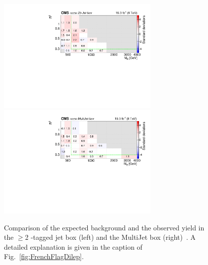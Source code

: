 \begin{figure}[tb!]
\centering
\includegraphics[width=0.7\textwidth]{figs/analysis8TeV/nSigmaLog_Jet2b.pdf}
\includegraphics[width=0.7\textwidth]{figs/analysis8TeV/nSigmaLog_MultiJetFITS.pdf}
\caption{Comparison of the expected background and the observed yield
  in the $\geq$2 \PQb-tagged jet box (left) and the MultiJet box
  (right)~\cite{razor8TeV,jmgd}. A detailed explanation is given in the caption of
  Fig.~\ref{fig:FrenchFlagDilep}.\label{fig:FrenchFlagHad}}

\end{figure}


